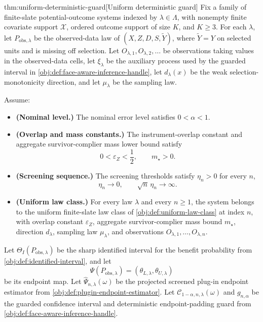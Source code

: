 \documentclass[11pt]{article}
\begin{document}
\begin{theoremv}{thm:uniform-deterministic-guard}[Uniform deterministic guard]
Fix a family of finite-slate potential-outcome systems indexed by \(\lambda\in\Lambda\), with nonempty finite covariate support \(\mathcal X\), ordered outcome support of size \(K\), and \(K\ge 3\).  For each \(\lambda\), let \(P_{\mathrm{obs},\lambda}\) be the observed-data law of \((X,Z,D,S,\widetilde Y)\), where \(\widetilde Y=Y\) on selected units and is missing off selection.  Let \(O_{\lambda,1},O_{\lambda,2},\ldots\) be observations taking values in the observed-data cells, let \(\xi_\lambda\) be the auxiliary process used by the guarded interval in \cref{obj:def:face-aware-inference-handle}, let \(d_\lambda(x)\) be the weak selection-monotonicity direction, and let \(\mu_\lambda\) be the sampling law.

Assume:
\begin{itemize}
\item \textbf{(Nominal level.)} The nominal error level satisfies \(0<\alpha<1\).
\item \textbf{(Overlap and mass constants.)} The instrument-overlap constant and aggregate survivor-complier mass lower bound satisfy
\[
0<\varepsilon_Z<\frac12,
\qquad
m_{\star}>0 .
\]
\item \textbf{(Screening sequence.)} The screening thresholds satisfy \(\eta_n>0\) for every \(n\),
\[
\eta_n\to 0,
\qquad
\sqrt n\,\eta_n\to\infty .
\]
\item \textbf{(Uniform law class.)} For every law \(\lambda\) and every \(n\ge 1\), the system belongs to the uniform finite-slate law class of \cref{obj:def:uniform-law-class} at index \(n\), with overlap constant \(\varepsilon_Z\), aggregate survivor-complier mass bound \(m_{\star}\), direction \(d_\lambda\), sampling law \(\mu_\lambda\), and observations \(O_{\lambda,1},\ldots,O_{\lambda,n}\).
\end{itemize}

Let \(\Theta_I(P_{\mathrm{obs},\lambda})\) be the sharp identified interval for the benefit probability from \cref{obj:def:identified-interval}, and let
\[
\Psi(P_{\mathrm{obs},\lambda})
=
(\theta_{L,\lambda},\theta_{U,\lambda})
\]
be its endpoint map.  Let \(\widehat\Psi_{n,\lambda}(\omega)\) be the projected screened plug-in endpoint estimator from \cref{obj:def:plugin-endpoint-estimator}.  Let \(\mathcal C_{1-\alpha,n,\lambda}(\omega)\) and \(g_{n,\alpha}\) be the guarded confidence interval and deterministic endpoint-padding guard from \cref{obj:def:face-aware-inference-handle}.


\end{theoremv}
\end{document}
